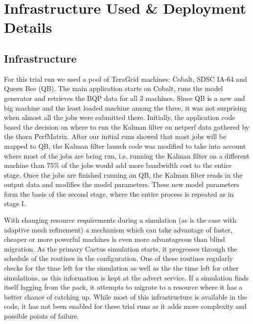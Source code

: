 \documentclass[conference,final]{IEEEtran}
\begin{document}

\section{Infrastructure Used \& Deployment Details}

\subsection{Infrastructure}
For this trial run we used a pool of TeraGrid machines: Cobalt, SDSC
IA-64 and Queen Bee (QB). The main application starts on Cobalt, runs the
model generator and retrieves the BQP data for all 3 machines.  Since
QB is a new and big machine and the least loaded machine among
the three, it was not surprising when almost all the jobs were
submitted there.  Initially, the application code based the decision
on where to run the Kalman filter on netperf data gathered by the
thorn PerfMatrix. After our initial runs showed that most jobs will be
mapped to QB, the Kalman filter launch code was modified to
take into account where most of the jobs are being run, i.e. running
the Kalman filter on a different machine than 75\% of the jobs would
add more bandwidth cost to the entire stage. Once the jobs are
finished running on QB, the Kalman filter reads in the output
data and modifies the model parameters. These new model parameters
form the basis of the second stage, where the entire process is
repeated as in stage I.

With changing resource requirements during a simulation (as is the
case with adaptive mesh refinement) a mechanism which can take
advantage of faster, cheaper or more powerful machines is even more
advantageous than blind migration. As the primary Cactus simulation
starts, it progresses through the schedule of the routines in the
configuration. One of these routines regularly checks for the time
left for the simulation as well as the the time left for other
simulations, as this information is kept at the advert service. If a
simulation finds itself lagging from the pack, it attempts to migrate
to a resource where it has a better chance of catching up. While most
of this infrastructure is available in the code, it has not been
enabled for these trial runs as it adds more complexity and possible
points of failure.
\end{document}
